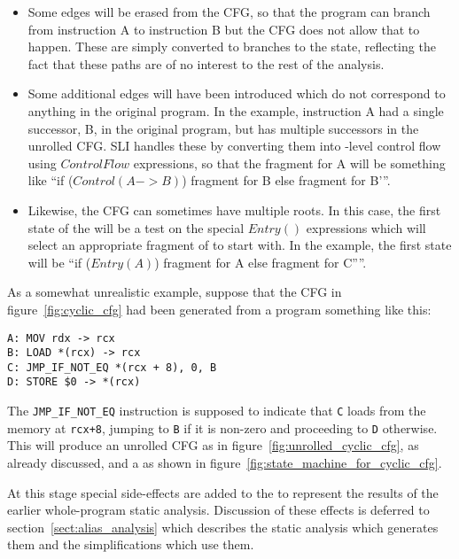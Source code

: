 \begin{itemize}
\item
  Some edges will be erased from the CFG, so that the program can
  branch from instruction A to instruction B but the CFG does not
  allow that to happen.  These are simply converted to branches to the
   state, reflecting the fact that these paths are of
  no interest to the rest of the analysis.

\item
  Some additional edges will have been introduced which do not
  correspond to anything in the original program.  In the example,
  instruction A had a single successor, B, in the original program,
  but has multiple successors in the unrolled CFG.  SLI handles these
  by converting them into \StateMachine-level control flow using
  $ControlFlow$ expressions, so that the \StateMachine fragment for A
  will be something like ``if ($Control(A->B)$) {fragment for B} else
  {fragment for B'}''.

\item
  Likewise, the CFG can sometimes have multiple roots.  In this case,
  the first state of the \StateMachine will be a test on the special
  $Entry()$ expressions which will select an appropriate fragment of
  \StateMachine to start with.  In the example, the first state will
  be ``if ($Entry(A)$) {fragment for A} else { fragment for C''}''.
\end{itemize}

As a somewhat unrealistic example, suppose that the CFG in
figure~\ref{fig:cyclic_cfg} had been generated from a program
something like this:

\begin{verbatim}
A: MOV rdx -> rcx
B: LOAD *(rcx) -> rcx
C: JMP_IF_NOT_EQ *(rcx + 8), 0, B
D: STORE $0 -> *(rcx)
\end{verbatim}

The \verb|JMP_IF_NOT_EQ| instruction is supposed to indicate that
\verb|C| loads from the memory at \verb|rcx+8|, jumping to \verb|B| if
it is non-zero and proceeding to \verb|D| otherwise.  This will
produce an unrolled CFG as in figure~\ref{fig:unrolled_cyclic_cfg}, as
already discussed, and a \StateMachine as shown in
figure~\ref{fig:state_machine_for_cyclic_cfg}.

At this stage special side-effects are added to the {\StateMachine} to
represent the results of the earlier whole-program static analysis.
Discussion of these effects is deferred to
section~\ref{sect:alias_analysis} which describes the static analysis
which generates them and the {\StateMachine} simplifications which use
them.

